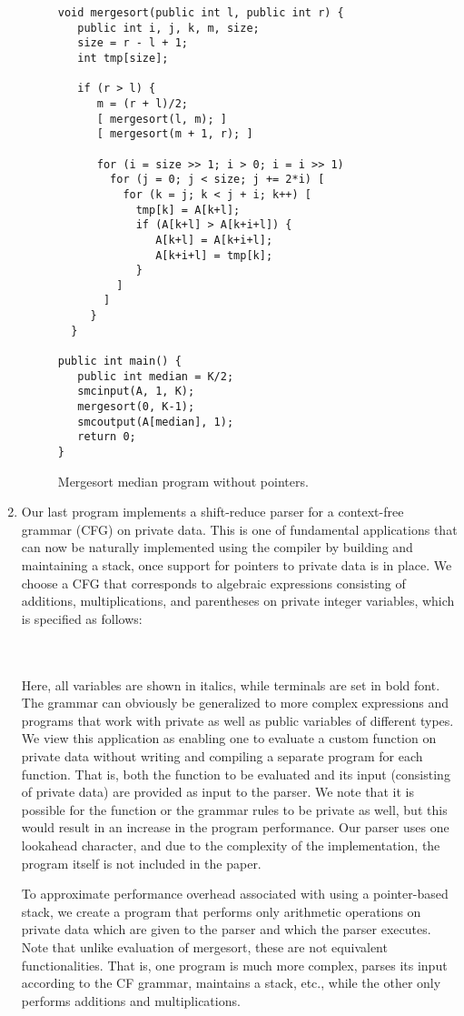 \documentclass[11pt]{article}
\begin{document}
\begin{enumerate}
\begin{figure}[t!]
\begin{verbatim}
void mergesort(public int l, public int r) {
   public int i, j, k, m, size;
   size = r - l + 1;
   int tmp[size];
   
   if (r > l) {
      m = (r + l)/2;
      [ mergesort(l, m); ]
      [ mergesort(m + 1, r); ]
      
      for (i = size >> 1; i > 0; i = i >> 1) 
        for (j = 0; j < size; j += 2*i) [
          for (k = j; k < j + i; k++) [
            tmp[k] = A[k+l];
            if (A[k+l] > A[k+i+l]) {
               A[k+l] = A[k+i+l];
               A[k+i+l] = tmp[k];
            }
         ]
       ]
     }
  }
  
public int main() {
   public int median = K/2;
   smcinput(A, 1, K);
   mergesort(0, K-1);
   smcoutput(A[median], 1);
   return 0;
}\end{verbatim}
\caption{Mergesort median program without pointers.} \label{fig:ms}
\end{figure}

\item Our last program implements a shift-reduce parser for a context-free
  grammar (CFG) on private data. This is one of fundamental applications
  that can now be naturally implemented using the compiler by building and
  maintaining a stack, once support for pointers to private data is in place.
  We choose a CFG that corresponds to algebraic expressions consisting of
  additions, multiplications, and parentheses on private integer variables,
  which is specified as follows:
  
  \smallskip
 \\
 \\
 

  \smallskip Here, all variables are shown in italics, while terminals are
  set in bold font. The grammar can obviously be generalized to more complex
  expressions and programs that work with private as well as public
  variables of different types. We view this application as enabling one to
  evaluate a custom function on private data without writing and compiling a
  separate program for each function. That is, both the function to be
  evaluated and its input (consisting of private data) are provided as input
  to the parser. We note that it is possible for the function or the grammar
  rules to be private as well, but this would result in an increase in the
  program performance. Our parser uses one lookahead character, and due to
  the complexity of the implementation, the program itself is not included
  in the paper.  
  
  To approximate performance overhead associated with using a pointer-based
  stack, we create a program that performs only arithmetic operations on
  private data which are given to the parser and which the parser executes.
  Note that unlike evaluation of  mergesort, these are not equivalent
  functionalities. That is, one program is much more complex, parses its
  input according to the CF grammar, maintains a stack, etc., while the
  other only performs additions and multiplications.
\end{enumerate}
\end{document}
